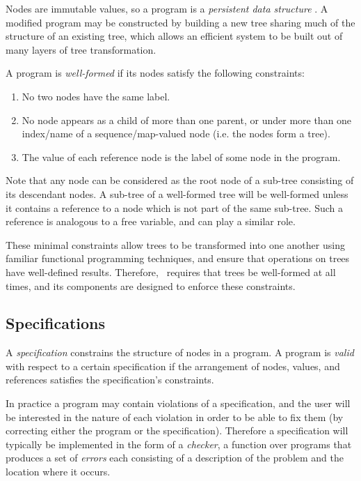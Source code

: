 Nodes are immutable values, so a program is a \emph{persistent data structure} \cite{sarnak}. A modified program may be constructed by building a new tree sharing much of the structure of an existing tree, which allows an efficient system to be built out of many layers of tree transformation.

A program is \emph{well-formed} if its nodes satisfy the following constraints:
\begin{enumerate}
\item No two nodes have the same label.
\item No node appears as a child of more than one parent, or under more than one index/name of a sequence/map-valued node (i.e. the nodes form a tree).
\item The value of each reference node is the label of some node in the program.
\end{enumerate}

Note that any node can be considered as the root node of a sub-tree consisting of its descendant nodes. A sub-tree of a well-formed tree will be well-formed unless it contains a reference to a node which is not part of the same sub-tree. Such a reference is analogous to a free variable, and can play a similar role.

These minimal constraints allow trees to be transformed into one another using familiar functional programming techniques, and ensure that operations on trees have well-defined results. Therefore, \Meta\ requires that trees be well-formed at all times, and its components are designed to enforce these constraints.


\subsection{Specifications}
A \emph{specification} constrains the structure of nodes in a program. A program is \emph{valid} with respect to a certain specification if the arrangement of nodes, values, and references satisfies the specification's constraints.

In practice a program may contain violations of a specification, and the user will be interested in the nature of each violation in order to be able to fix them (by correcting either the program or the specification). Therefore a specification will typically be implemented in the form of a \emph{checker}, a function over programs that produces a set of \emph{errors} each consisting of a description of the problem and the location where it occurs.

